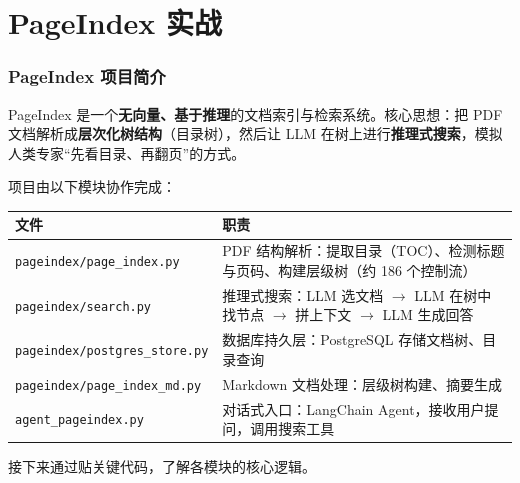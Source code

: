 \documentclass[presentation,aspectratio=169]{ctexbeamer}
\begin{document}

\section{PageIndex 实战}


\begin{frame}
\frametitle{PageIndex 项目简介}
{\footnotesize PageIndex 是一个\textbf{无向量、基于推理}的文档索引与检索系统。核心思想：把 PDF 文档解析成\textbf{层次化树结构}（目录树），然后让 LLM 在树上进行\textbf{推理式搜索}，模拟人类专家``先看目录、再翻页''的方式。}

\vspace{0.15cm}
{\footnotesize 项目由以下模块协作完成：}

\vspace{0.1cm}
\begin{table}
\centering
{\scriptsize
\begin{tabular}{lp{8.5cm}}
\toprule
\textbf{文件} & \textbf{职责} \\
\midrule
\texttt{pageindex/page\_index.py} & PDF 结构解析：提取目录（TOC）、检测标题与页码、构建层级树（约 186 个控制流） \\
\texttt{pageindex/search.py} & 推理式搜索：LLM 选文档 $\rightarrow$ LLM 在树中找节点 $\rightarrow$ 拼上下文 $\rightarrow$ LLM 生成回答 \\
\texttt{pageindex/postgres\_store.py} & 数据库持久层：PostgreSQL 存储文档树、目录查询 \\
\texttt{pageindex/page\_index\_md.py} & Markdown 文档处理：层级树构建、摘要生成 \\
\texttt{agent\_pageindex.py} & 对话式入口：LangChain Agent，接收用户提问，调用搜索工具 \\
\bottomrule
\end{tabular}}
\end{table}

\vspace{0.1cm}
{\footnotesize 接下来通过贴关键代码，了解各模块的核心逻辑。}
\end{frame}

\end{document}
